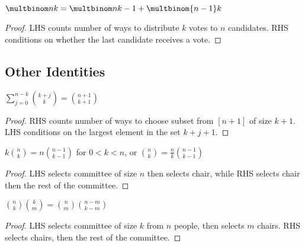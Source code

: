 \documentclass[a4paper]{article}
\begin{document}
\begin{theorem}
$\displaystyle\multbinom nk=\multbinom n{k-1}+\multbinom{n-1}k$

\begin{hl}
\begin{proof}
LHS counts number of ways to distribute $k$ votes to $n$ candidates. RHS conditions on whether the last candidate receives a vote.
\end{proof}
\end{hl}
\end{theorem}

\subsection{Other Identities}

\begin{theorem}
$\displaystyle \sum_{j=0}^{n-k}\binom{k+j}k=\binom{n+1}{k+1}$

\begin{hl}
\begin{proof}
RHS counts number of ways to choose subset from $[n+1]$ of size $k+1$. LHS conditions on the largest element in the set $k+j+1$.
\end{proof}
\end{hl}
\end{theorem}

\begin{theorem}
$\displaystyle k\binom nk=n\binom{n-1}{k-1}$ for $0<k<n$, or $\displaystyle \binom nk=\frac nk\binom{n-1}{k-1}$
\begin{hl}
\begin{proof}
LHS selects committee of size $n$ then selects chair, while RHS selects chair then the rest of the committee.
\end{proof}
\end{hl}
\end{theorem}

\begin{theorem}\label{extended_absorption}
$\displaystyle\binom nk\binom km=\binom nm\binom{n-m}{k-m}$

\begin{hl}
\begin{proof}
LHS selects committee of size $k$ from $n$ people, then selects $m$ chairs. RHS selects chairs, then the rest of the committee.
\end{proof}
\end{hl}
\end{theorem}
\end{document}
